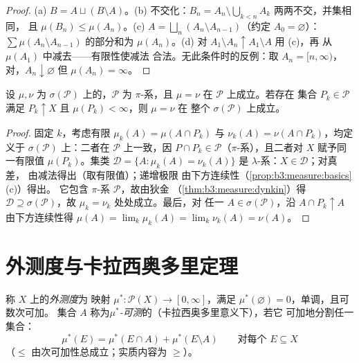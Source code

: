 \begin{proof}
(a) $B = A \sqcup (B\setminus A)$。(b) 不交化：$B_n = A_n
\setminus \bigcup_{k<n}A_k$ 两两不交，并集相同，
且 $\mu(B_n) \leq \mu(A_n)$。(c) $A = \bigsqcup_n (A_n
\setminus A_{n-1})$（约定 $A_0 = \varnothing$）：
$\sum\mu(A_n\setminus A_{n-1})$ 的部分和为 $\mu(A_n)$。(d) 对
$A_1 \setminus A_n \uparrow A_1 \setminus A$ 用 (c)，再
从 $\mu(A_1)$ 中减去——有限性使减法
合法。无此条件时的反例：取 $A_n = [n, \infty)$，
对，$A_n \downarrow \varnothing$ 但 $\mu(A_n) =
\infty$。
\end{proof}

\begin{theorem}[唯一性]\label{thm:b3:measure:uniqueness}
设 $\mu, \nu$ 为 $\sigma(\mathcal P)$ 上的，$\mathcal
P$ 为 $\pi$-系，且 $\mu = \nu$ 在 $\mathcal P$ 上成立。若存在
集合 $P_k \in \mathcal P$ 满足 $P_k \uparrow X$ 且
$\mu(P_k) < \infty$，则 $\mu = \nu$ 在
整个 $\sigma(\mathcal P)$ 上成立。
\end{theorem}

\begin{proof}
固定 $k$，考虑有限 $\mu_k(A) = \mu(A \cap
P_k)$ 与 $\nu_k(A) = \nu(A \cap P_k)$，均定义于 $\sigma(\mathcal
P)$ 上：二者在 $\mathcal P$ 上一致，因 $P \cap P_k \in \mathcal
P$（$\pi$-系），且二者对 $X$ 赋予同一有限值
$\mu(P_k)$。集类 $\mathcal D = \{A : \mu_k(A) =
\nu_k(A)\}$ 是 $\lambda$-系：$X \in \mathcal D$；对真差，
由减法得出（取有限值）；递增极限
由下方连续性（\cref{prop:b3:measure:basics}(c)）得出。
它包含 $\pi$-系 $\mathcal P$，故由狄金
（\cref{thm:b3:measure:dynkin}）得 $\mathcal D \supseteq
\sigma(\mathcal P)$，故 $\mu_k = \nu_k$ 处处成立。最后，对
任一 $A \in \sigma(\mathcal P)$，沿 $A
\cap P_k \uparrow A$ 由下方连续性得 $\mu(A) = \lim_k\mu_k(A) =
\lim_k\nu_k(A) = \nu(A)$。
\end{proof}

\section{外测度与卡拉西奥多里定理}

\begin{definition}\label{def:b3:measure:outer}
称 $X$ 上的\emph{外测度}为
映射 $\mu^* \colon \mathcal P(X) \to [0, \infty]$，满足
$\mu^*(\varnothing) = 0$，单调，且可数次可加。
集合 $A$ 称为\emph{$\mu^*$-可测}的（卡拉西奥多里意义下），若它
可加地分割任一集合：
\[
\mu^*(E) = \mu^*(E \cap A) + \mu^*(E \setminus A)
\qquad \text{对每个 } E \subseteq X
\]
（$\leq$ 由次可加性总成立；实质内容为 $\geq$）。
\end{definition}

